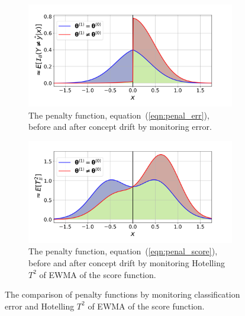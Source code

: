 \documentclass[twoside,11pt]{article}
\begin{document}
\begin{figure}[!htbp]
\centering
 \begin{subfigure}[t]{0.49\linewidth}
         \centering
         \includegraphics[width=\textwidth, trim=.2in .2in .7in .45in, clip]{../figures/v14/demons_fig/2D_err_logi_trunc_norm.png}
         \caption{The penalty function, equation~(\ref{eqn:penal_err}), before and after concept drift by monitoring error.}
         \label{fig:logi_err_rate_penal}
  \end{subfigure}
 \begin{subfigure}[t]{0.49\linewidth}
         \centering
    \includegraphics[width = \textwidth, trim=.2in .2in .7in .45in, clip]{../figures/v14/demons_fig/2D_score_logi_modi_trunc_norm.png}
         \caption{The penalty function, equation~(\ref{eqn:penal_score}), before and after concept drift by monitoring Hotelling $T^2$ of EWMA of the score function.}
         \label{fig:logi_score_rate_penal}
  \end{subfigure}
  \caption{The comparison of penalty functions by monitoring classification error and Hotelling $T^2$ of EWMA of the score function.}
  \label{fig:logi_med_penal}
\end{figure}
\end{document}
